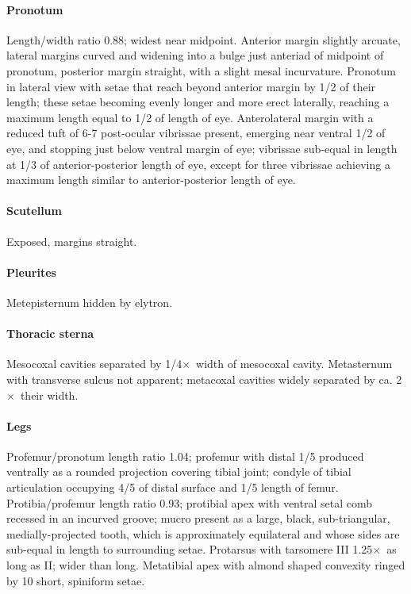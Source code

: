 \documentclass[fleqn,10pt,lineno]{wlpeerj} %
\newcommand{\x}{$\times$~}
\begin{document}
			\paragraph{Pronotum}
				Length/width ratio 0.88; widest near midpoint. 
				Anterior margin slightly arcuate, lateral margins curved and widening into a bulge just anteriad of midpoint of pronotum, posterior margin straight, with a slight mesal incurvature. 
				Pronotum in lateral view with setae that reach beyond anterior margin by 1/2 of their length; these setae becoming evenly longer and more erect laterally, reaching a maximum length equal to 1/2 of length of eye. 
				Anterolateral margin with a reduced tuft of 6-7 post-ocular vibrissae present, emerging near ventral 1/2 of eye, and stopping just below ventral margin of eye; vibrissae sub-equal in length at 1/3 of anterior-posterior length of eye, except for three vibrissae achieving a maximum length similar to anterior-posterior length of eye.
			\paragraph{Scutellum}
				Exposed, margins straight.
			\paragraph{Pleurites}
				Metepisternum hidden by elytron.
			\paragraph{Thoracic sterna}
				Mesocoxal cavities separated by 1/4\x width of mesocoxal cavity. 
				Metasternum with transverse sulcus not apparent; metacoxal cavities widely separated by ca. 2\x their width.
			\paragraph{Legs}
				Profemur/pronotum length ratio 1.04; profemur with distal 1/5 produced ventrally as a rounded projection covering tibial joint; condyle of tibial articulation occupying 4/5 of distal surface and 1/5 length of femur. 
				Protibia/profemur length ratio 0.93; protibial apex with ventral setal comb recessed in an incurved groove; mucro present as a large, black, sub-triangular, medially-projected tooth, which is approximately equilateral and whose sides are sub-equal in length to surrounding setae. 
				Protarsus with tarsomere III 1.25\x as long as II; wider than long. 
				Metatibial apex with almond shaped convexity ringed by 10 short, spiniform setae.
\end{document}
